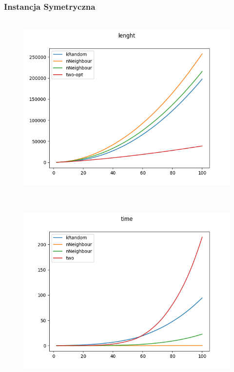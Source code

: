 \documentclass[11pt]{article}
\begin{document}
\subsubsection{Instancja Symetryczna }
            \begin{center}
            \begin{figure}[H]

                \\ \includegraphics[scale=0.7]{images/lenght_sym.png}\

            \end{figure}
            \end{center}
            \begin{center}
            \begin{figure}[H]

                \\ \includegraphics[scale=0.7]{images/time_sym.png}\

            \end{figure}
            \end{center}
\end{document}
